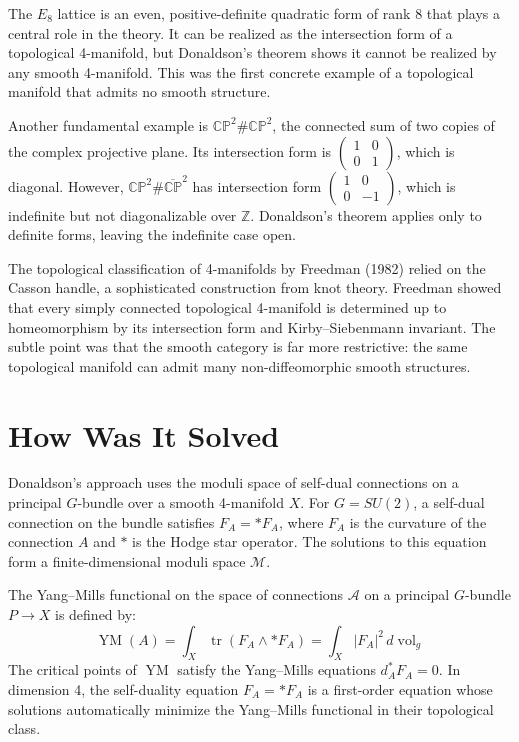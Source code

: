 The $E_8$ lattice is an even, positive-definite quadratic form of rank 8 that plays a central role in the theory. It can be realized as the intersection form of a topological 4-manifold, but Donaldson's theorem shows it cannot be realized by any smooth 4-manifold. This was the first concrete example of a topological manifold that admits no smooth structure.

Another fundamental example is $\mathbb{CP}^2 \# \mathbb{CP}^2$, the connected sum of two copies of the complex projective plane. Its intersection form is $\begin{pmatrix} 1 & 0 \\ 0 & 1 \end{pmatrix}$, which is diagonal. However, $\mathbb{CP}^2 \# \overline{\mathbb{CP}}^2$ has intersection form $\begin{pmatrix} 1 & 0 \\ 0 & -1 \end{pmatrix}$, which is indefinite but not diagonalizable over $\mathbb{Z}$. Donaldson's theorem applies only to definite forms, leaving the indefinite case open.

The topological classification of 4-manifolds by Freedman (1982) relied on the Casson handle, a sophisticated construction from knot theory. Freedman showed that every simply connected topological 4-manifold is determined up to homeomorphism by its intersection form and Kirby--Siebenmann invariant. The subtle point was that the smooth category is far more restrictive: the same topological manifold can admit many non-diffeomorphic smooth structures.

\section{How Was It Solved}

Donaldson's approach uses the moduli space of self-dual connections on a principal $G$-bundle over a smooth 4-manifold $X$. For $G = SU(2)$, a self-dual connection on the bundle satisfies $F_A = \ast F_A$, where $F_A$ is the curvature of the connection $A$ and $\ast$ is the Hodge star operator. The solutions to this equation form a finite-dimensional moduli space $\mathcal{M}$.

The Yang--Mills functional on the space of connections $\mathcal{A}$ on a principal $G$-bundle $P \to X$ is defined by:
\[
\operatorname{YM}(A) = \int_X \operatorname{tr}(F_A \wedge \ast F_A) = \int_X |F_A|^2 \, d\operatorname{vol}_g
\]
The critical points of $\operatorname{YM}$ satisfy the Yang--Mills equations $d_A^* F_A = 0$. In dimension 4, the self-duality equation $F_A = \ast F_A$ is a first-order equation whose solutions automatically minimize the Yang--Mills functional in their topological class.

